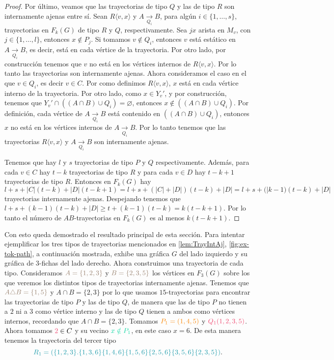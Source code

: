 \begin{proof}
    Por \'ultimo, veamos que las trayectorias de tipo $Q$ y las de tipo $R$ son
    internamente ajenas entre s\'i. Sean $R\langle v,x \rangle$ y $A
    \xrightarrow[Q_i]{}  B$, para alg\'un $i \in \{1, \dots, s\}$, trayectorias
    en $F_k(G)$ de tipo $R$ y $Q$, respectivamente. Sea $jx$ arista en $M_v$,
    con $j \in \{1, \dots, l\}$, entonces $x \notin P_j$. Si tomamos $v \notin
    Q_i$, entonces $v$ est\'a est\'atico en $A \xrightarrow[Q_i]{} B$, es decir,
    est\'a en cada v\'ertice de la trayectoria. Por otro lado, por
    construcci\'on tenemos que $v$ no est\'a en los v\'ertices internos de $R
    \langle v, x \rangle$. Por lo tanto las trayectorias son internamente
    ajenas. Ahora consideramos el caso en el que $v \in Q_i$, es decir $v \in
    C$. Por como definimos $R \langle v,x \rangle$, $x$ est\'a en cada v\'ertice
    interno de la trayectoria. Por otro lado, como $x \in Y_v'$, y por
    construcci\'on, tenemos que $Y_v ' \cap ((A\cap B) \cup Q_i) = \varnothing$,
    entonces $x \notin ((A \cap B) \cup Q_i)$. Por definici\'on, cada v\'ertice
    de $A \xrightarrow[Q_i]{}  B$ est\'a contenido en $((A \cap B) \cup Q_i)$,
    entonces $x$ no est\'a en los v\'ertices internos de $A \xrightarrow[Q_i]{}
    B$. Por lo tanto tenemos que las trayectorias $R \langle v,x \rangle$ y $A
    \xrightarrow[Q_i]{}  B$ son internamente ajenas.

    Tenemos que hay $l$ y $s$ trayectorias de tipo $P$ y $Q$ respectivamente.
    Adem\'as, para cada $v \in C$ hay $t-k$ trayectorias de tipo $R$ y para cada
    $v \in D$ hay $t-k+1$ trayectorias de tipo $R$. Entonces en $F_k(G)$ hay $l+
    s+ |C|(t-k)+ |D|(t-k +1) = l + s + (|C| + |D|)(t-k) + |D| = l + s +
    (|k-1)(t-k) + |D|$ trayectorias internamente ajenas. Despejando tenemos que
    $l + s + (k-1)(t-k) + |D| \geq t+ (k-1)(t-k) = k (t -k +1)$. Por lo tanto el
    n\'umero de $AB$-trayectorias en $F_k(G)$ es al menos $k(t-k+1)$.

\end{proof}

Con esto queda demostrado el resultado principal de esta secci\'on. Para
intentar ejemplificar los tres tipos de trayectorias mencionados en
\cref{lem:TrayIntAj}, \cref{fig:ex-tok-path}, a continuaci\'on mostrada, exhibe
una gr\'afica $G$ del lado izquierdo y su gr\'afica de $3$-fichas del lado
derecho. Ahora construimos una trayectoria de cada tipo. Consideramos
${\color{baige}A= \{1,2,3\}}$ y ${\color{baige}B=\{2,3,5\}}$ los v\'ertices en
$F_3(G)$ sobre los que veremos los distintos tipos de trayectorias internamente
ajenas. Tenemos que ${\color{baige}A\triangle B=\{1,5\}}$ y $A\cap B=\{2,3\}$
por lo que usamos $15$-trayectorias para encontrar las trayectorias de tipo $P$
y las de tipo $Q$, de manera que las de tipo $P$ no tienen a $2$ ni a $3$ como
v\'ertice interno y las de tipo $Q$ tienen a ambos como v\'ertices internos,
recordando que $A\cap B=\{2,3\}$. Tomamos ${\color{naranja}P_1=(1,4,5)}$ y
${\color{fushia}Q_1(1,2,3,5)}$. Ahora tomamos ${\color{fushia}2} \in C$ y su
vecino ${\color{menta}x\notin P_1}$, en este caso $x=6$. De esta manera tenemos
la trayectoria del tercer tipo
\[
    {\color{verdeAzulado}R_1=(\{1,2,3\}.\{1,3,6\}\{1,4,6\}\{1,5,6\}\{2,5,6\}
    \{3,5,6\}\{2,3,5\})}.
\]


